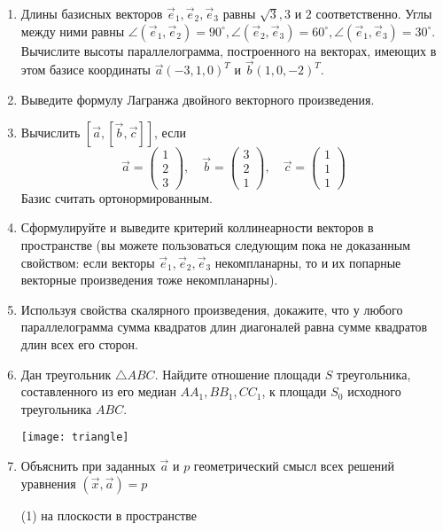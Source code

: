 \begin{enumerate}
	\item Длины базисных векторов $\vec e_1, \vec e_2, \vec e_3$ равны $\sqrt 3, 3$ и $2$ соответственно. Углы между ними равны $\angle(\vec e_1, \vec e_2) = 90^\circ, \angle(\vec e_2, \vec e_3) = 60^\circ, \angle(\vec e_1, \vec e_3) = 30^\circ$. Вычислите высоты параллелограмма, построенного на векторах, имеющих в этом базисе координаты $\vec a (-3, 1, 0)^T$ и $\vec b (1, 0, -2)^T$.

	 	  \item Выведите формулу Лагранжа двойного векторного произведения.
	 	
	 \item Вычислить $[\vec a,[\vec b, \vec c]]$, если 
	$$\vec a = \begin{pmatrix}
	    	1 \\ 2 \\ 3
	    \end{pmatrix},\quad
	   \vec b = \begin{pmatrix}
	    	3 \\ 2 \\ 1	    
	    \end{pmatrix},\quad
	    \vec c = \begin{pmatrix}
	    	1 \\ 1 \\ 1  
	    \end{pmatrix} $$
	    Базис считать ортонормированным. 
	    

	  \item Сформулируйте и выведите критерий коллинеарности векторов в пространстве (вы можете пользоваться следующим пока не доказанным свойством: если векторы $\vec e_1, \vec e_2, \vec e_3$ некомпланарны, то и их попарные векторные произведения тоже некомпланарны).
	
	  
	  \item Используя свойства скалярного произведения, докажите, что у любого параллелограмма сумма квадратов длин диагоналей равна сумме квадратов длин всех его сторон.
	  
	  \item Дан треугольник $\triangle ABC$. Найдите отношение площади $S$ треугольника, составленного из его медиан $AA_1, BB_1, CC_1$, к площади $S_0$ исходного треугольника $ABC$.
	  \begin{figure*}[ht]
	  	\centering
	  	\texttt{[image: triangle]}
	  \end{figure*}
	  
	  \item Объяснить при заданных $\vec a$ и $p$ геометрический смысл всех решений уравнения $(\vec x, \vec a) = p$
	    \begin{tasks}(1)
		        \task на плоскости
		        \task в пространстве 
	    \end{tasks}
	  \end{enumerate}